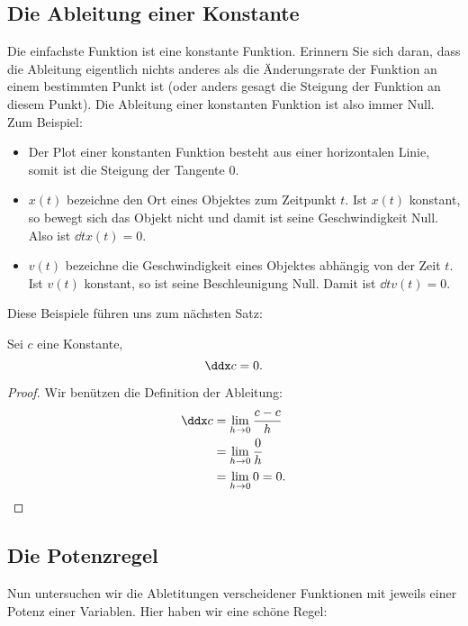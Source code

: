 \subsection*{Die Ableitung einer Konstante}

Die einfachste Funktion ist eine konstante Funktion. Erinnern Sie sich daran, dass die Ableitung eigentlich nichts anderes als die Änderungsrate der Funktion an einem bestimmten Punkt ist (oder anders gesagt die Steigung der Funktion an diesem Punkt). Die Ableitung einer konstanten Funktion ist also immer Null. Zum Beispiel:
\begin{itemize}
\item Der Plot einer konstanten Funktion besteht aus einer horizontalen Linie, somit ist die Steigung der Tangente 0.
\item $x(t)$ bezeichne den Ort eines Objektes zum Zeitpunkt $t$. Ist $x(t)$ konstant, so bewegt sich das Objekt nicht und damit ist seine Geschwindigkeit Null. Also ist $\dd{t} x(t) = 0$.
\item $v(t)$ bezeichne die Geschwindigkeit eines Objektes abhängig von der Zeit $t$. Ist $v(t)$ konstant, so ist seine Beschleunigung Null. Damit ist $\dd{t} v(t) = 0$.
\end{itemize}
Diese Beispiele führen uns zum nächsten Satz:


\begin{mainTheorem}
Sei $c$ eine Konstante,
\[
\ddx c = 0.
\]
\end{mainTheorem}

\begin{proof}
Wir benützen die Definition der Ableitung:
\begin{align*}
\ddx c &= \lim_{h\to 0}\frac{c-c}{h}\\
&= \lim_{h\to 0} \frac{0}{h}\\
&= \lim_{h\to 0} 0 = 0.
\end{align*}
\end{proof}


\subsection*{Die Potenzregel}

Nun untersuchen wir die Abletitungen verscheidener Funktionen mit jeweils einer Potenz einer Variablen.
 Hier haben wir eine schöne Regel:

